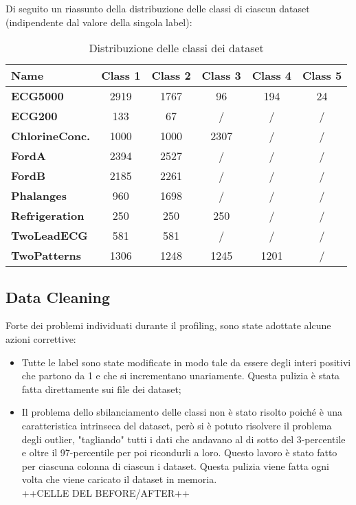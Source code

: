 Di seguito un riassunto della distribuzione delle classi di ciascun dataset (indipendente dal valore della singola label):
\begin{table}[H]
	\centering
	\begin{tabularx}{\textwidth}{X c c c c c}
		\hline
		\textbf{Name} & \textbf{Class 1} & \textbf{Class 2} & \textbf{Class 3} & \textbf{Class 4} & \textbf{Class 5} \\
		\hline
		\textbf{ECG5000} & 2919 & 1767 & 96 & 194 & 24\\
		\textbf{ECG200} & 133 & 67 & / & / & /\\
		\textbf{ChlorineConc.} & 1000 & 1000 & 2307 & / & /\\
		\textbf{FordA} & 2394 & 2527 & / & / & /\\
		\textbf{FordB} & 2185 & 2261 & / & / & /\\
		\textbf{Phalanges} & 960 & 1698 & / & / & /\\
		\textbf{Refrigeration} & 250 & 250 & 250 & / & /\\
		\textbf{TwoLeadECG} & 581 & 581 & / & / & /\\
		\textbf{TwoPatterns} & 1306 & 1248 & 1245 & 1201 & /\\
	\end{tabularx}
	\caption{Distribuzione delle classi dei dataset}
	\label{tab:labels}
\end{table}

\subsection{Data Cleaning}
Forte dei problemi individuati durante il profiling, sono state adottate alcune azioni correttive:
\begin{itemize}
	\item Tutte le label sono state modificate in modo tale da essere degli interi positivi che partono da 1 e che si incrementano unariamente. Questa pulizia è stata fatta direttamente sui file dei dataset;
	\item Il problema dello sbilanciamento delle classi non è stato risolto poiché è una caratteristica intrinseca del dataset, però si è potuto risolvere il problema degli outlier, "tagliando" tutti i dati che andavano al di sotto del 3-percentile e oltre il 97-percentile per poi ricondurli a loro. Questo lavoro è stato fatto per ciascuna colonna di ciascun i dataset. Questa pulizia viene fatta ogni volta che viene caricato il dataset in memoria.\\
	++CELLE DEL BEFORE/AFTER++
\end{itemize}


